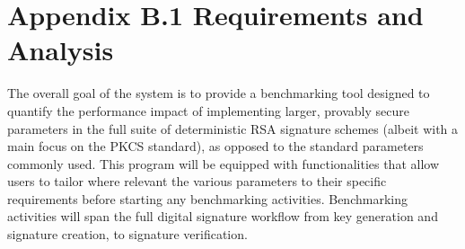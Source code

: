 \documentclass[]{final_report}
\theoremstyle{definition}
\begin{document}
\section{Appendix B.1 Requirements and Analysis}
The overall goal of the system is to provide a benchmarking tool designed to quantify the performance impact of implementing larger, provably secure parameters in the full suite of deterministic RSA signature schemes (albeit with a main focus on the PKCS standard), as opposed to the standard parameters commonly used. This program will be equipped with functionalities that allow users to tailor where relevant the various parameters to their specific requirements before starting any benchmarking activities. Benchmarking activities will span the full digital signature workflow from key generation and signature creation, to signature verification.
\end{document}
